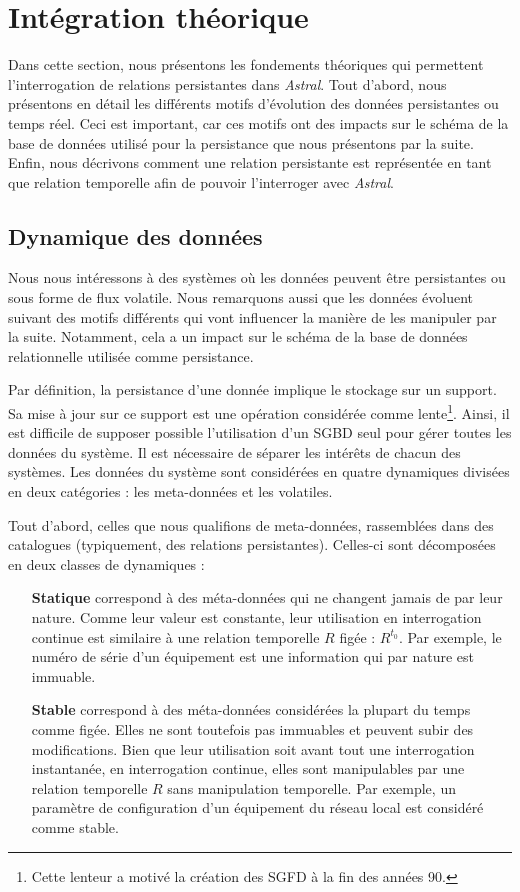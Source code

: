 \section{Intégration théorique}\label{sec:contrib:asteroid:theorie}
Dans cette section, nous présentons les fondements théoriques qui permettent l'interrogation de relations persistantes dans \textit{Astral}. Tout d'abord, nous présentons en détail les différents motifs d'évolution des données persistantes ou temps réel. Ceci est important, car ces motifs ont des impacts sur le schéma de la base de données utilisé pour la persistance que nous présentons par la suite. Enfin, nous décrivons comment une relation persistante est représentée en tant que relation temporelle afin de pouvoir l'interroger avec \textit{Astral}.

\subsection{Dynamique des données}
Nous nous intéressons à des systèmes où les données peuvent être persistantes ou sous forme de flux volatile. Nous remarquons aussi que les données évoluent suivant des motifs différents qui vont influencer la manière de les manipuler par la suite. Notamment, cela a un impact sur le schéma de la base de données relationnelle utilisée comme persistance.

Par définition, la persistance d'une donnée implique le stockage sur un support. Sa mise à jour sur ce support est une opération considérée comme lente\footnote{Cette lenteur a motivé la création des SGFD à la fin des années 90.}. Ainsi, il est difficile de supposer possible l'utilisation d'un SGBD seul pour gérer toutes les données du système. Il est nécessaire de séparer les intérêts de chacun des systèmes. Les données du système sont considérées en quatre dynamiques divisées en deux catégories : les meta-données et les volatiles. 

Tout d'abord, celles que nous qualifions de meta-données, rassemblées dans des catalogues (typiquement, des relations persistantes). Celles-ci sont décomposées en deux classes de dynamiques :
\begin{itemize}
	\item[\textbf{Statique}] correspond à des méta-données qui ne changent jamais de par leur nature. Comme leur valeur est constante, leur utilisation en interrogation continue est similaire à une relation temporelle $R$ figée : $R^{t_0}$. Par exemple, le numéro de série d'un équipement est une information qui par nature est immuable.
	\item[\textbf{Stable}] correspond à des méta-données considérées la plupart du temps comme figée. Elles ne sont toutefois pas immuables et peuvent subir des modifications. Bien que leur utilisation soit avant tout une interrogation instantanée, en interrogation continue, elles sont manipulables par une relation temporelle $R$ sans manipulation temporelle. Par exemple, un paramètre de configuration d'un équipement du réseau local est considéré comme stable.
\end{itemize}

